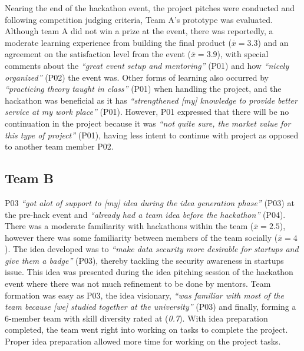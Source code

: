 \documentclass[runningheads]{llncs}
\begin{document}
Nearing the end of the hackathon event, the project pitches were conducted and following competition judging criteria, Team A's prototype was evaluated. Although team A did not win a prize at the event, there was reportedly, a moderate learning experience from building the final product ($\overline{x} = 3.3$) and an agreement on the satisfaction level from the event ($\overline{x} = 3.9$), with special comments about the \textit{``great event setup and mentoring''} (P01) and how \textit{``nicely organized''} (P02) the event was. %
Other forms of learning also occurred by \textit{``practicing theory taught in class''} (P01) when handling the project, and the hackathon was beneficial as it has \textit{``strengthened [my] knowledge to provide better service at my work place''} (P01). However, P01 expressed that there will be no continuation in the project because it was \textit{``not quite sure, the market value for this type of project''} (P01), having less intent to continue with project as opposed to another team member P02.


\subsection{Team B}
P03 \textit{``got alot of support to [my] idea during the idea generation phase''} (P03) at the pre-hack event and \textit{``already had a team idea before the hackathon''} (P04). There was a moderate familiarity with hackathons within the team ($\overline{x} = 2.5$), however there was some familiarity between members of the team socially ($\overline{x} = 4$). The idea developed was to \textit{``make data security more desirable for startups and give them a badge''} (P03), thereby tackling the security awareness in startups issue. This idea was presented during the idea pitching session of the hackathon event where there was not much refinement to be done by mentors. Team formation was easy as P03, the idea visionary, \textit{``was familiar with most of the team because [we] studied together at the university''} (P03) and finally, forming a 6-member team with skill diversity rated at (\textit{0.7}). With idea preparation completed, the team went right into working on tasks to complete the project. Proper idea preparation allowed more time for working on the project tasks. 
\end{document}
